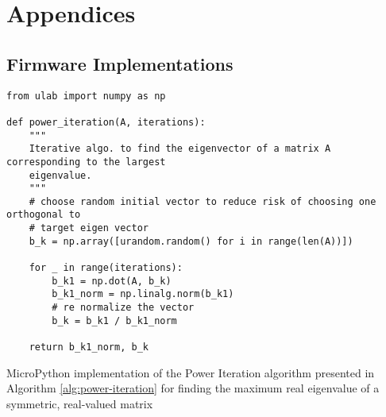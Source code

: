 \chapter{Appendices}
\label{chapter:appendices}

\graphicspath{ {report/Appendices/assets/} } 


\section{Firmware Implementations}
\label{app:firmware}

\begin{listing}[!htb]
\small
\begin{verbatim}
from ulab import numpy as np

def power_iteration(A, iterations):
    """
    Iterative algo. to find the eigenvector of a matrix A corresponding to the largest
    eigenvalue.
    """
    # choose random initial vector to reduce risk of choosing one orthogonal to 
    # target eigen vector
    b_k = np.array([urandom.random() for i in range(len(A))])

    for _ in range(iterations):
        b_k1 = np.dot(A, b_k)
        b_k1_norm = np.linalg.norm(b_k1)
        # re normalize the vector
        b_k = b_k1 / b_k1_norm

    return b_k1_norm, b_k

\end{verbatim}
\caption{MicroPython implementation of the Power Iteration algorithm presented in Algorithm \ref{alg:power-iteration} for finding the maximum real eigenvalue of a symmetric, real-valued matrix}
\label{app-listing:power-iteration-mpy}
\end{listing}


